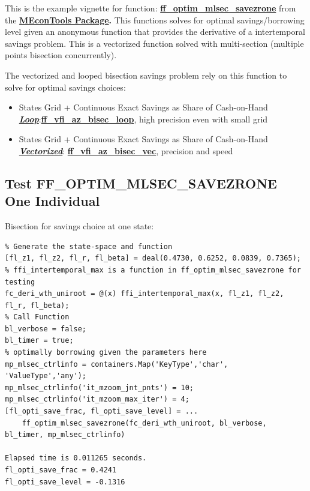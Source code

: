 \documentclass[
]{book}
\begin{document}
This is the example vignette for function:
\href{https://github.com/FanWangEcon//MEconTools/blob/master/MEconTools/optim/ff_optim_mlsec_savezrone.m}{\textbf{ff\_optim\_mlsec\_savezrone}}
from the \href{https://fanwangecon.github.io/MEconTools/}{\textbf{MEconTools
Package}}\textbf{.} This
functions solves for optimal savings/borrowing level given an anonymous
function that provides the derivative of a intertemporal savings
problem. This is a vectorized function solved with multi-section
(multiple points bisection concurrently).

The vectorized and looped bisection savings problem rely on this
function to solve for optimal savings choices:

\begin{itemize}
\item
  States Grid + Continuous Exact Savings as Share of Cash-on-Hand
  \underline{\textbf{\emph{Loop}}}:\href{https://github.com/FanWangEcon/MEconTools/blob/master/MEconTools/vfi/ff_vfi_az_bisec_loop.m}{\textbf{ff\_vfi\_az\_bisec\_loop}},
  high precision even with small grid
\item
  States Grid + Continuous Exact Savings as Share of Cash-on-Hand
  \underline{\textbf{\emph{Vectorized}}}:
  \href{https://github.com/FanWangEcon/MEconTools/blob/master/MEconTools/vfi/ff_vfi_az_bisec_vec.m}{\textbf{ff\_vfi\_az\_bisec\_vec}},
  precision and speed
\end{itemize}

\hypertarget{test-ff_optim_mlsec_savezrone-one-individual}{%
\subsection{Test FF\_OPTIM\_MLSEC\_SAVEZRONE One Individual}\label{test-ff_optim_mlsec_savezrone-one-individual}}

Bisection for savings choice at one state:

\begin{verbatim}
% Generate the state-space and function
[fl_z1, fl_z2, fl_r, fl_beta] = deal(0.4730, 0.6252, 0.0839, 0.7365);
% ffi_intertemporal_max is a function in ff_optim_mlsec_savezrone for testing
fc_deri_wth_uniroot = @(x) ffi_intertemporal_max(x, fl_z1, fl_z2, fl_r, fl_beta);
% Call Function
bl_verbose = false;
bl_timer = true;
% optimally borrowing given the parameters here
mp_mlsec_ctrlinfo = containers.Map('KeyType','char', 'ValueType','any');
mp_mlsec_ctrlinfo('it_mzoom_jnt_pnts') = 10;
mp_mlsec_ctrlinfo('it_mzoom_max_iter') = 4;
[fl_opti_save_frac, fl_opti_save_level] = ...
    ff_optim_mlsec_savezrone(fc_deri_wth_uniroot, bl_verbose, bl_timer, mp_mlsec_ctrlinfo)

Elapsed time is 0.011265 seconds.
fl_opti_save_frac = 0.4241
fl_opti_save_level = -0.1316
\end{verbatim}
\end{document}
